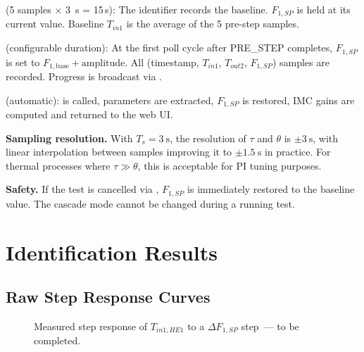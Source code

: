 \begin{description}[leftmargin=2.5cm, style=nextline, itemsep=4pt]
  \item[PRE\_STEP] (5 samples $\times$ \SI{3}{\second} = 15\,\si{\second}):
    The identifier records the baseline. $F_{1,SP}$ is held at its current value.
    Baseline $T_{in1}$ is the average of the 5 pre-step samples.

  \item[STEP] (configurable duration):
    At the first poll cycle after PRE\_STEP completes, $F_{1,SP}$ is set to
    $F_{1,\text{base}} + \text{amplitude}$. All (timestamp, $T_{in1}$, $T_{out2}$,
    $F_{1,SP}$) samples are recorded. Progress is broadcast via .

  \item[DONE] (automatic):
     is called, parameters are extracted, $F_{1,SP}$ is restored,
    IMC gains are computed and returned to the web UI.
\end{description}

\textbf{Sampling resolution.} With $T_s = \SI{3}{\second}$, the resolution of $\tau$ and
$\theta$ is $\pm\SI{3}{\second}$, with linear interpolation between samples improving it
to $\pm\SI{1.5}{\second}$ in practice. For thermal processes where $\tau \gg \theta$, this
is acceptable for PI tuning purposes.

\textbf{Safety.} If the test is cancelled via ,
$F_{1,SP}$ is immediately restored to the baseline value. The cascade mode cannot be
changed during a running test.

\section{Identification Results}


\subsection{Raw Step Response Curves}

\begin{figure}[H]
  \centering
  \caption{Measured step response of $T_{in1,HE1}$ to a $\Delta F_{1,SP}$
    step~--- to be completed.}
  \label{fig:step_response}
\end{figure}

